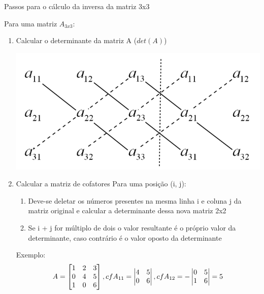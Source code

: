 \documentclass[10pt]{beamer}
\begin{document}
\begin{frame}[fragile]{Passos para o cálculo da inversa da matriz 3x3}
  
  Para uma matriz $A_{3x3}$:
  \begin{enumerate}
  \item Calcular o determinante da matriz A ($det(A)$)
  
   \begin{center}
      \includegraphics[scale=0.15]{images/determinante.png}  
   \end{center}
  
  \item Calcular a matriz de cofatores \newline
  Para uma posição (i, j):
    \begin{enumerate}
      \item Deve-se deletar os números presentes na mesma linha i e coluna j da matriz original e calcular a determinante dessa nova matriz 2x2
      \item Se i + j for múltiplo de dois o valor resultante é o próprio valor da determinante, caso contrário é o valor oposto da determinante
    \end{enumerate}
  Exemplo: 
    \[
    A = \begin{bmatrix}
      1 & 2 & 3 \\
      0 & 4 & 5 \\
      1 & 0 & 6
    \end{bmatrix}, 
    cfA_{11} = \begin{vmatrix}
      4 & 5 \\ 
      0 & 6 \notag
    \end{vmatrix}, 
    cfA_{12} = -\begin{vmatrix}
      0 & 5 \\ 
      1 & 6 \notag
    \end{vmatrix}
    =
    5    
    \]
  \end{enumerate}

\end{frame}
\end{document}
